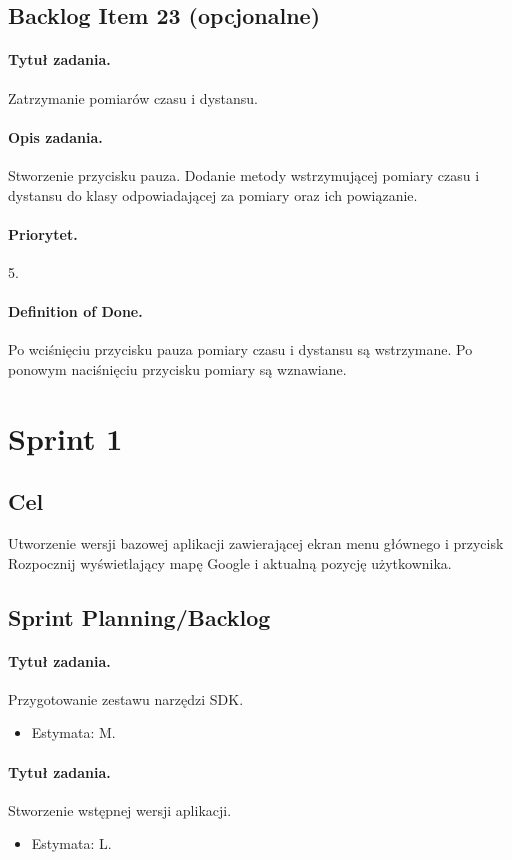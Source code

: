 \documentclass[a4paper]{article}
\begin{document}
\subsection{Backlog Item 23 (opcjonalne)}
\paragraph{Tytuł zadania.} Zatrzymanie pomiarów czasu i dystansu.
\paragraph{Opis zadania.} Stworzenie przycisku pauza. Dodanie metody wstrzymującej pomiary czasu i dystansu do klasy odpowiadającej za pomiary oraz ich powiązanie.
\paragraph{Priorytet.} 5.
\paragraph{Definition of Done.} Po wciśnięciu przycisku pauza pomiary czasu i dystansu są wstrzymane. Po ponowym naciśnięciu przycisku pomiary są wznawiane.

\section{Sprint 1}
\subsection{Cel} Utworzenie wersji bazowej aplikacji zawierającej ekran menu głównego i przycisk Rozpocznij wyświetlający mapę Google i aktualną pozycję użytkownika.
\subsection{Sprint Planning/Backlog}

\paragraph{Tytuł zadania.} Przygotowanie zestawu narzędzi SDK.
\begin{itemize}
\item Estymata: M.
\end{itemize}

\paragraph{Tytuł zadania.} Stworzenie wstępnej wersji aplikacji.
\begin{itemize}
\item Estymata: L.
\end{itemize}
\end{document}
